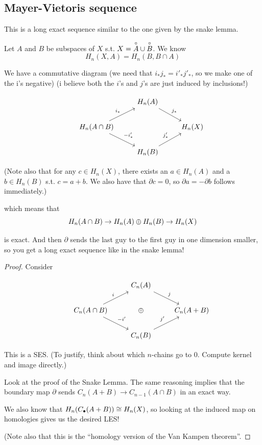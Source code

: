 \documentclass[11pt,leqno,oneside]{amsart}
\newenvironment{dateenv}{
  \vspace{1em}
}{
  \vspace{1em}
}
\newcommand{\mydate}[4]{
  \newdate{#1}{#2}{#3}{#4}
  \begin{dateenv}
    \hfill\displaydate{#1}
  \end{dateenv}
}
\numberwithin{thm}{section}
\renewcommand{\d}{\partial}
\newcommand{\homl}[1][n]{H_{#1}}
\begin{document}
\mydate{dm}{21}{4}{2017}
\renewcommand{\homl}[1][n]{H_{#1}}
\subsection{Mayer-Vietoris sequence}

This is a long exact sequence similar to the one given by the snake lemma.

Let $A$ and $B$ be subspaces of $X$ s.t. $X = \overset{\circ}{A} \cup \overset{\circ}{B}$.  We know
$$ \homl(X, A) = \homl(B, B \cap A) $$

We have a commutative diagram (we need that $i_* j_* = i'_* j'_*$, so we make one of the i's negative) (i believe both the $i$'s and $j$'s are just induced by inclusions!)

$$\begin{tikzcd}
  &\, & \homl(A) \arrow[rd, "j_*"] \\
  &\homl(A \cap B) \arrow[ru, "i_*"] \arrow[rd, "-i'_*"] & &\homl(X) \\
  & &\homl(B) \arrow[ru, "j'_*"]
\end{tikzcd}$$

(Note also that for any $c \in \homl(X)$, there exists an $a \in \homl(A)$ and a $b \in \homl(B)$ s.t. $c = a + b$.  We also have that $\d c = 0$, so $\d a = - \d b$ follows immediately.)

which means that
$$ \homl(A \cap B) \to \homl(A) \dsum \homl(B) \to \homl(X) $$

is exact.  And then $\d$ sends the last guy to the first guy in one dimension smaller, so you get a long exact sequence like in the snake lemma!

\begin{proof}
  Consider

  $$\begin{tikzcd}
  &\, & C_n(A) \arrow[rd, "j"] \\
  &C_n(A \cap B) \arrow[ru, "i"] \arrow[rd, "-i'"] &\dsum &C_n(A + B) \\
  & &C_n(B) \arrow[ru, "j'"]
  \end{tikzcd}$$

  This is a SES.  (To justify, think about which $n$-chains go to 0.  Compute kernel and image directly.)

  Look at the proof of the Snake Lemma.  The same reasoning implies that the boundary map $\d$ sends $C_n(A + B) \to C_{n-1}(A \cap B)$ in an exact way.

  We also know that $\homl(C_\bullet(A+B)) \isom H_n(X)$, so looking at the induced map on homologies gives us the desired LES!

  (Note also that this is the ``homology version of the Van Kampen theorem''.
\end{proof}
\end{document}
